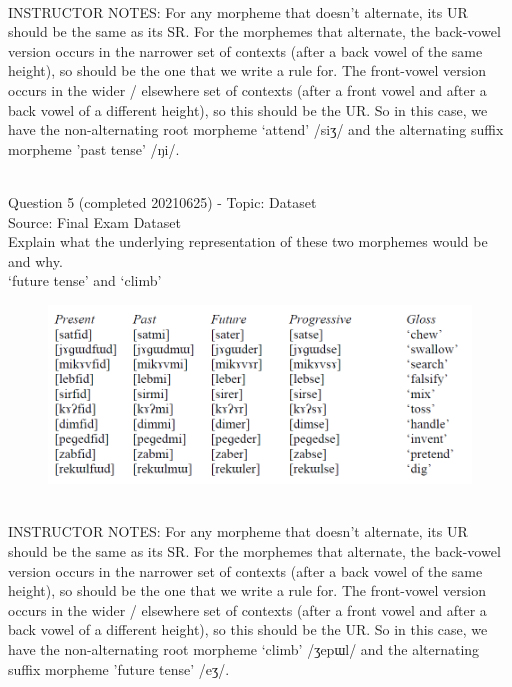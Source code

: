 \documentclass[12pt]{article}
\begin{document}
~\\
INSTRUCTOR NOTES: For any morpheme that doesn’t alternate, its UR should be the same as its SR.  For the morphemes that alternate, the back-vowel version occurs in the narrower set of contexts (after a back vowel of the same height), so should be the one that we write a rule for. The front-vowel version occurs in the wider / elsewhere set of contexts (after a front vowel and after a back vowel of a different height), so this should be the UR. So in this case, we have the non-alternating root morpheme ‘attend’ /siʒ/ and the alternating suffix morpheme 'past tense' /ŋi/.


~\\

{\large Question 5} (completed 20210625) - Topic: Dataset\\
Source: Final Exam Dataset\\

Explain what the underlying representation of these two morphemes would be and why.\\

`future tense' and `climb'

\begin{figure}[H]
\includegraphics{../images/final_dataset.png}
\end{figure}

~\\
INSTRUCTOR NOTES: For any morpheme that doesn’t alternate, its UR should be the same as its SR.  For the morphemes that alternate, the back-vowel version occurs in the narrower set of contexts (after a back vowel of the same height), so should be the one that we write a rule for. The front-vowel version occurs in the wider / elsewhere set of contexts (after a front vowel and after a back vowel of a different height), so this should be the UR. So in this case, we have the non-alternating root morpheme ‘climb’ /ʒepɯl/ and the alternating suffix morpheme 'future tense' /eʒ/.
\end{document}
